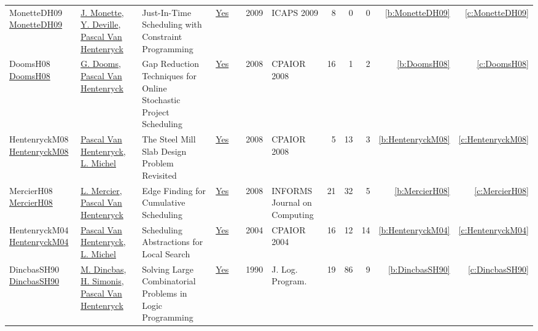 {\begin{longtable}{>{\raggedright\arraybackslash}p{3cm}>{\raggedright\arraybackslash}p{6cm}>{\raggedright\arraybackslash}p{6.5cm}rrrp{2.5cm}rrrrr}
MonetteDH09 \href{http://aaai.org/ocs/index.php/ICAPS/ICAPS09/paper/view/712}{MonetteDH09} & \hyperref[auth:a150]{J. Monette}, \hyperref[auth:a152]{Y. Deville}, \hyperref[auth:a149]{Pascal Van Hentenryck} & Just-In-Time Scheduling with Constraint Programming & \href{../works/MonetteDH09.pdf}{Yes} & \cite{MonetteDH09} & 2009 & ICAPS 2009 & 8 & 0 & 0 & \ref{b:MonetteDH09} & \ref{c:MonetteDH09}\\
DoomsH08 \href{https://doi.org/10.1007/978-3-540-68155-7\_8}{DoomsH08} & \hyperref[auth:a365]{G. Dooms}, \hyperref[auth:a149]{Pascal Van Hentenryck} & Gap Reduction Techniques for Online Stochastic Project Scheduling & \href{../works/DoomsH08.pdf}{Yes} & \cite{DoomsH08} & 2008 & CPAIOR 2008 & 16 & 1 & 2 & \ref{b:DoomsH08} & \ref{c:DoomsH08}\\
HentenryckM08 \href{https://doi.org/10.1007/978-3-540-68155-7\_41}{HentenryckM08} & \hyperref[auth:a149]{Pascal Van Hentenryck}, \hyperref[auth:a32]{L. Michel} & The Steel Mill Slab Design Problem Revisited & \href{../works/HentenryckM08.pdf}{Yes} & \cite{HentenryckM08} & 2008 & CPAIOR 2008 & 5 & 13 & 3 & \ref{b:HentenryckM08} & \ref{c:HentenryckM08}\\
MercierH08 \href{http://dx.doi.org/10.1287/ijoc.1070.0226}{MercierH08} & \hyperref[auth:a864]{L. Mercier}, \hyperref[auth:a149]{Pascal Van Hentenryck} & Edge Finding for Cumulative Scheduling & \href{../works/MercierH08.pdf}{Yes} & \cite{MercierH08} & 2008 & INFORMS Journal on Computing & 21 & 32 & 5 & \ref{b:MercierH08} & \ref{c:MercierH08}\\
HentenryckM04 \href{https://doi.org/10.1007/978-3-540-24664-0\_22}{HentenryckM04} & \hyperref[auth:a149]{Pascal Van Hentenryck}, \hyperref[auth:a32]{L. Michel} & Scheduling Abstractions for Local Search & \href{../works/HentenryckM04.pdf}{Yes} & \cite{HentenryckM04} & 2004 & CPAIOR 2004 & 16 & 12 & 14 & \ref{b:HentenryckM04} & \ref{c:HentenryckM04}\\
DincbasSH90 \href{https://doi.org/10.1016/0743-1066(90)90052-7}{DincbasSH90} & \hyperref[auth:a726]{M. Dincbas}, \hyperref[auth:a17]{H. Simonis}, \hyperref[auth:a149]{Pascal Van Hentenryck} & Solving Large Combinatorial Problems in Logic Programming & \href{../works/DincbasSH90.pdf}{Yes} & \cite{DincbasSH90} & 1990 & J. Log. Program. & 19 & 86 & 9 & \ref{b:DincbasSH90} & \ref{c:DincbasSH90}\\
\end{longtable}
}

\clearpage
